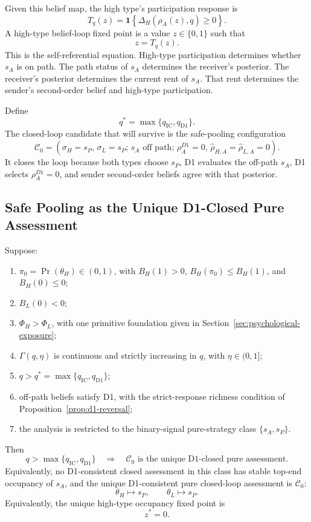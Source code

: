 Given this belief map, the high type's participation response is
\[
T_q(z)
=
\mathbf{1}\left\{
\Delta_H(\rho_A(z),q)\ge 0
\right\}.
\]
A high-type belief-loop fixed point is a value \(z\in\{0,1\}\) such that
\[
z=T_q(z).
\]
This is the self-referential equation. High-type participation determines whether \(s_A\) is on path. The path status of \(s_A\) determines the receiver's posterior. The receiver's posterior determines the current rent of \(s_A\). That rent determines the sender's second-order belief and high-type participation.

Define
\[
q^*=\max\{q_{\mathrm{IC}},q_{\mathrm{D1}}\}.
\]
The closed-loop candidate that will survive is the safe-pooling configuration
\[
\mathcal C_0
=
\left(
\sigma_H=s_P,\,
\sigma_L=s_P;\,
s_A\text{ off path};\,
\rho_A^{D1}=0,\,
\widehat\rho_{H,A}=\widehat\rho_{L,A}=0
\right).
\]
It closes the loop because both types choose \(s_P\), D1 evaluates the off-path \(s_A\), D1 selects \(\rho_A^{D1}=0\), and sender second-order beliefs agree with that posterior.

\subsection{Safe Pooling as the Unique D1-Closed Pure Assessment}
\label{subsec:top-down-pooling-closed-fixed-point}

\begin{theorem}
\label{thm:top-down-pooling}
Suppose:
\begin{enumerate}
\item \(\pi_0=\Pr(\theta_H)\in(0,1)\), with \(B_H(1)>0\), \(B_H(\pi_0)\le B_H(1)\), and \(B_H(0)\le 0\);
\item \(B_L(0)<0\);
\item \(\Phi_H>\Phi_L\), with one primitive foundation given in Section~\ref{sec:psychological-exposure};
\item \(\Gamma(q,\eta)\) is continuous and strictly increasing in \(q\), with \(\eta\in(0,1]\);
\item \(q>q^*=\max\{q_{\mathrm{IC}},q_{\mathrm{D1}}\}\);
\item off-path beliefs satisfy D1, with the strict-response richness condition of Proposition~\ref{prop:d1-reversal};
\item the analysis is restricted to the binary-signal pure-strategy class \(\{s_A,s_P\}\).
\end{enumerate}
Then
\[
q>\max\{q_{\mathrm{IC}},q_{\mathrm{D1}}\}
\quad\Rightarrow\quad
\mathcal C_0 \text{ is the unique D1-closed pure assessment.}
\]
Equivalently, no D1-consistent closed assessment in this class has stable top-end occupancy of \(s_A\), and the unique D1-consistent pure closed-loop assessment is \(\mathcal C_0\):
\[
\theta_H\mapsto s_P,
\qquad
\theta_L\mapsto s_P.
\]
Equivalently, the unique high-type occupancy fixed point is
\[
z^*=0.
\]
\end{theorem}

